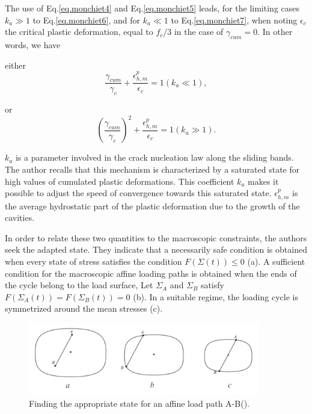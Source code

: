 The use of Eq.\eqref{eq.monchiet4} and Eq.\eqref{eq.monchiet5} leads, for the limiting cases $k_a \gg 1$ to Eq.\eqref{eq.monchiet6}, and for $k_a \ll 1$ to Eq.\eqref{eq.monchiet7}, when noting $\epsilon_c$ the critical plastic deformation, equal to $f_c / 3$ in the case of $\gamma_{cum}=0$. In other words, we have

either 
\begin{equation}
\dfrac{\gamma_{cum}}{\gamma_{c}}+\dfrac{\epsilon_{h,m}^p}{\epsilon_c}=1 \left( k_a \ll 1\right) ,
\label{eq.monchiet6}
\end{equation}

or
\begin{equation}
\left( \dfrac{\gamma_{cum}}{\gamma_{c}}\right) ^2+\dfrac{\epsilon_{h,m}^p}{\epsilon_c}=1 \left( k_a \gg 1\right) .
\label{eq.monchiet7}
\end{equation}

$k_a$ is a parameter involved in the crack nucleation law along the sliding bands. The author recalls that this mechanism is characterized by a saturated state for high values of cumulated plastic deformations. This coefficient $k_a$ makes it possible to adjust the speed of convergence towards this saturated state. $\epsilon_{h,m}^p$ is the average hydrostatic part of the plastic deformation due to the growth of the cavities.

In order to relate these two quantities to the macroscopic constraints, the authors seek the adapted state. They indicate that a necessarily safe condition is obtained when every state of stress satisfies the condition $F (\Sigma(t)) \leqslant 0$ (a).  A sufficient condition for the macroscopic affine loading paths is obtained when the ends of the cycle belong to the load surface,
Let $\Sigma_A$ and $\Sigma_B$ satisfy $F (\Sigma_A(t)) = F (\Sigma_B (t)) = 0$ (b). In a suitable regime, the loading cycle is symmetrized around the mean stresses (c).

\begin{figure}[h!]
	\centering
	\includegraphics[width=0.9\textwidth]{figures//adaptation.png} 
	\caption{Finding the appropriate state for an affine load path A-B(\cite{koutiri2011effet}).}
	\label{fig.adaptation}
\end{figure}


